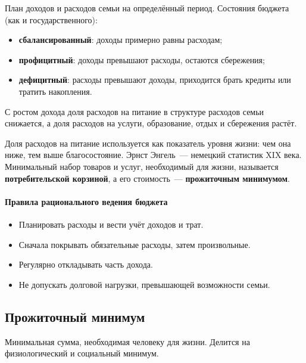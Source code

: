 \documentclass[12pt]{article}
\begin{document}
	\begin{definition}
		План доходов и расходов семьи на определённый период. Состояния бюджета (как и государственного):
		\begin{itemize}
			\item \textbf{сбалансированный}: доходы примерно равны расходам;
			\item \textbf{профицитный}: доходы превышают расходы, остаются сбережения;
			\item \textbf{дефицитный}: расходы превышают доходы, приходится брать кредиты или тратить накопления.
		\end{itemize}
	\end{definition}
	
	\begin{law}
		С ростом дохода доля расходов на питание в структуре расходов семьи снижается, а доля расходов на услуги, образование, отдых и сбережения растёт.
	\end{law}
	
	\begin{note}
		Доля расходов на питание используется как показатель уровня жизни: чем она ниже, тем выше благосостояние. Эрнст Энгель~--- немецкий статистик XIX века. Минимальный набор товаров и услуг, необходимый для жизни, называется \textbf{потребительской корзиной}, а его стоимость~--- \textbf{прожиточным минимумом}.
	\end{note}
	
	\paragraph{Правила рационального ведения бюджета}
	\begin{itemize}
		\item Планировать расходы и вести учёт доходов и трат.
		\item Сначала покрывать обязательные расходы, затем произвольные.
		\item Регулярно откладывать часть дохода.
		\item Не допускать долговой нагрузки, превышающей возможности семьи.
	\end{itemize}

	\subsection{Прожиточный минимум}

	\begin{definition}
		Минимальная сумма, необходимая человеку для жизни. Делится на физиологический и социальный минимум.
	\end{definition}
\end{document}
